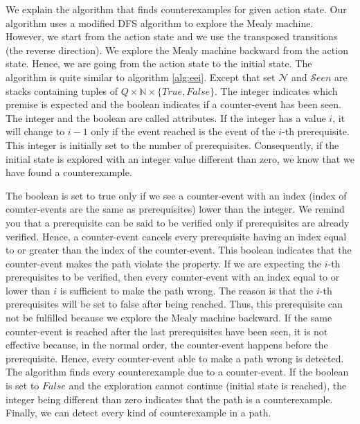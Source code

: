 We explain the algorithm that finds counterexamples for given action state.
Our algorithm uses a modified DFS algorithm to explore the Mealy machine.
However, we start from the action state and we use the transposed transitions (the reverse direction).
We explore the Mealy machine backward from the action state.
Hence, we are going from the action state to the initial state.
The algorithm is quite similar to algorithm \ref*{alg:eei}.
Except that set $\mathcal{N}$ and $\mathcal{S}een$ are stacks containing tuples of $Q\times\mathbb{N}\times\{True,False\}$.
The integer indicates which premise is expected and the boolean indicates if a counter-event has been seen.
The integer and the boolean are called attributes. 
If the integer has a value $i$, it will change to $i-1$ only if the event reached is the event of the $i$-th prerequisite.
This integer is initially set to the number of prerequisites.
Consequently, if the initial state is explored with an integer value different than zero, we know that we have found a counterexample.

The boolean is set to true only if we see a counter-event with an index (index of counter-events are the same as prerequisites) lower than the integer.
We remind you that a prerequisite can be said to be verified only if prerequisites are already verified. 
Hence, a counter-event cancels every prerequisite having an index equal to or greater than the index of the counter-event.
This boolean indicates that the counter-event makes the path violate the property.
If we are expecting the $i$-th prerequisites to be verified, then every counter-event with an index equal to or lower than $i$ is sufficient to make the path wrong.
The reason is that the $i$-th prerequisites will be set to false after being reached.
Thus, this prerequisite can not be fulfilled because we explore the Mealy machine backward.
If the same counter-event is reached after the last prerequisites have been seen, it is not effective because, in the normal order, the counter-event happens before the prerequisite.
Hence, every counter-event able to make a path wrong is detected.
The algorithm finds every counterexample due to a counter-event.
If the boolean is set to $False$ and the exploration cannot continue (initial state is reached), the integer being different than zero indicates that the path is a counterexample.
Finally, we can detect every kind of counterexample in a path. 

